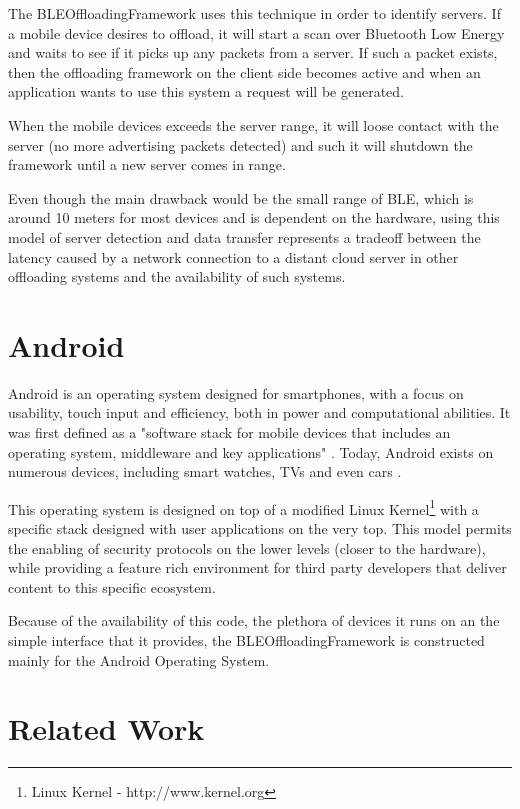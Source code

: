 The BLEOffloadingFramework uses this technique in order to identify servers. If a mobile device desires to offload, it will start a scan over Bluetooth Low Energy and waits to see if it picks up any packets from a server. If such a packet exists, then the offloading framework on the client side becomes active and when an application wants to use this system a request will be generated.

When the mobile devices exceeds the server range, it will loose contact with the server (no more advertising packets detected) and such it will shutdown the framework until a new server comes in range.

Even though the main drawback would be the small range of BLE, which is around 10 meters for most devices and is dependent on the hardware, using this model of server detection and data transfer represents a tradeoff between the latency caused by a network connection to a distant cloud server in other offloading systems and the availability of such systems.

\section{Android}
\label{android}

Android is an operating system designed for smartphones, with a focus on usability, touch input and efficiency, both in power and computational abilities. It was first defined as a "software stack for mobile devices that includes an operating system, middleware and key applications" \cite{developers2011android}. Today, Android exists on numerous devices, including smart watches, TVs and even cars \cite{androidwiki}.

This operating system is designed on top of a modified Linux Kernel\footnote{Linux Kernel - http://www.kernel.org} with a specific stack designed with user applications on the very top. This model permits the enabling of security protocols on the lower levels (closer to the hardware), while providing a feature rich environment for third party developers that deliver content to this specific ecosystem.

Because of the availability of this code, the plethora of devices it runs on an the simple interface that it provides, the BLEOffloadingFramework is constructed mainly for the Android Operating System.


\section{Related Work}
\label{relatedwork}

